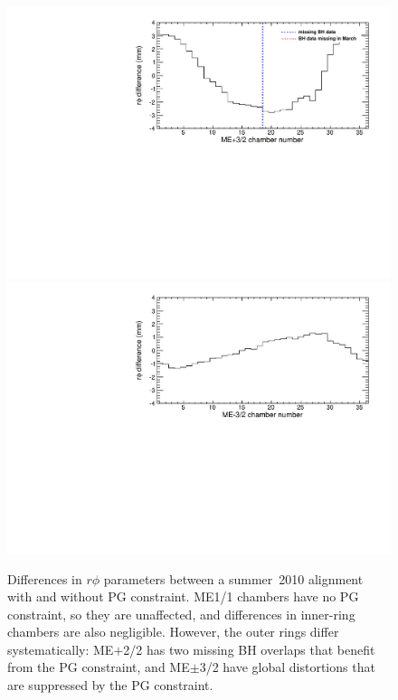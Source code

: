 \documentclass[12pt]{article}
\begin{document}
\begin{figure}
\begin{center}
\includegraphics[width=0.45\linewidth]{withPGtoNoPG_mep32.pdf}
\includegraphics[width=0.45\linewidth]{withPGtoNoPG_mem32.pdf}
\end{center}

\caption{Differences in $r\phi$ parameters between a summer~2010
  alignment with and without PG constraint.  ME1/1 chambers have no
  PG constraint, so they are unaffected, and differences in
  inner-ring chambers are also negligible.  However, the outer rings
  differ systematically: ME$+$2/2 has two missing BH overlaps that
  benefit from the PG constraint, and ME$\pm$3/2 have global
  distortions that are suppressed by the PG constraint. \label{fig:withPGtoNoPG_histograms}}
\end{figure}
\end{document}
